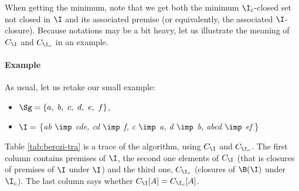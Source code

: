 When getting the minimum, note that we get both the minimum $\I_c$-closed set not closed in $\I$ and its associated premise (or equivalently, the associated $\I$-closure). Because notations may be a bit heavy, let us illustrate the meaning of $C_{\I}$ and $C_{\I_c}$ in an example.


\paragraph{Example} As usual, let us retake our small example:
\begin{itemize}
	\item $\Sg = \{a, \ b, \ c, \ d, \ e, \ f \}$,
	\item $\I =$ \{\textit{ab $\imp$ cde, cd $\imp$ f, c $\imp$ a, d $\imp$ b, 
		abcd $\imp$ ef} \} 
\end{itemize}
\noindent Table \ref{tab:berczi-tra} is a trace of the algorithm, using $C_{\I}$ and $C_{\I_c}$. The first column contains premises of $\I$, the second one elements of $C_{\I}$ (that is closures of premises of $\I$ under $\I$) and
the third one, $C_{\I_c}$ (closures of $\B(\I)$ under $\I_c$). The last column
says whether $C_{\I}[A] = C_{\I_c}[A]$.

